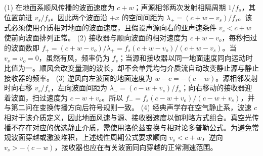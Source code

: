 (1) 在地面系顺风传播的波面速度为 \(c+w\)；声源相邻两次发射相隔周期 \(1/f_s\)，其位置前进 \(v_s/f_s\)。因此两个波面沿 \(+x\) 的空间间距为 \(\lambda_+=(c+w-v_s)/f_s\)。该式必须使用介质相对地面的波面速度，且假设声源向右的亚声速条件 \(v_s<c+w\) 使前向波面排列正常。
(2) 接收器与顺向波面的相对速度为 \(c+w-v_o\)，每秒扫过的波面数即 \(f_+=(c+w-v_o)/\lambda_+=f_s(c+w-v_o)/(c+w-v_s)\)。当 \(v_s=v_o=0\)，虽然有风，频率仍为 \(f_s\)；当源和接收器以同一地面速度同向运动时比值为一。顺风会改变量测的波长，却不会单凭均匀介质流自动改变静止源与静止接收器的频率。
(3) 逆风向左波面的地面速度为 \(w-c=-(c-w)\)。源相邻发射时向右移 \(v_s/f_s\)，左向波面间距为 \(\lambda_-=(c-w+v_s)/f_s\)；向右移动的接收器迎着波面，扫过速度为 \(c-w+v_o\)。所以 \(f_-=f_s(c-w+v_o)/(c-w+v_s)\)，并与第二问在变换传播方向后符号规则一致。
(4) 经典声学存在空气静止系，波速 \(c\) 相对于该介质定义，因此地面风速与源、接收器速度以伽利略方式组合。真空光传播不存在对应的优选静止介质，需使用洛伦兹变换与相对论多普勒公式。为避免常规波面穿越或激波堆积，上述线性周期公式要求顺向 \(v_s<c+w\)，逆向 \(v_s>-(c-w)\)，接收器也应在有关波面同向穿越的正常测速范围。
